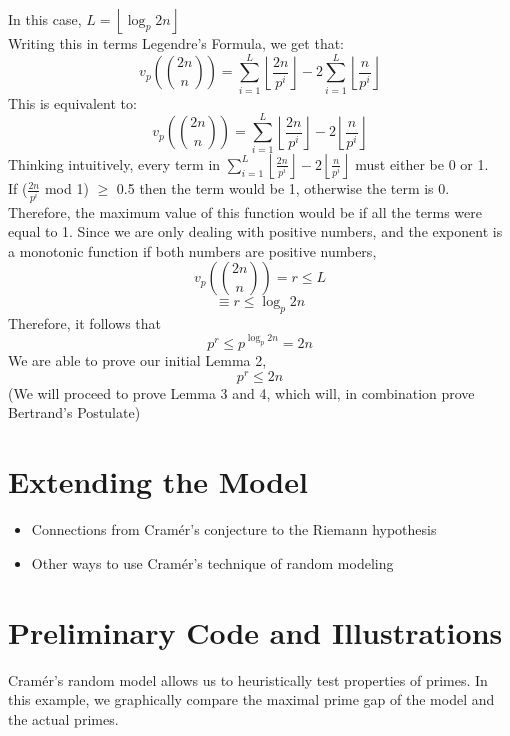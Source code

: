 \documentclass[12pt, letterpaper]{article}
\begin{document}
In this case, $L = \left\lfloor \log_{p}{2n} \right\rfloor$\\ Writing this in terms Legendre's Formula, we get that:
\[
    v_{p}(\binom{2n}{n}) = \sum_{i = 1}^{L} {\left\lfloor \frac{2n}{p^i} \right\rfloor} - 2\sum_{i = 1}^{L} {\left\lfloor \frac{n}{p^i} \right\rfloor}
\]
This is equivalent to:
\[
    v_{p}(\binom{2n}{n}) = \sum_{i = 1}^{L} {\left\lfloor \frac{2n}{p^i} \right\rfloor - 2\left\lfloor \frac{n}{p^i} \right\rfloor}
\]
Thinking intuitively, every term in $\sum_{i = 1}^{L} {\left\lfloor \frac{2n}{p^i} \right\rfloor - 2\left\lfloor \frac{n}{p^i} \right\rfloor}$ must either be 0 or 1.\\
If ($\frac{2n}{p^i}$ mod 1) $\geq$ 0.5 then the term would be 1, otherwise the term is 0. Therefore, the maximum value of this function would be if all the terms were equal to 1. Since we are only dealing with positive numbers, and the exponent is a monotonic function if both numbers are positive numbers,
\[
    v_{p}(\binom{2n}{n}) = r \leq L
\]
\[
    \equiv r \le \log_{p}{2n}
\]
Therefore, it follows that
\[
    p^r \le p^{\log_{p}{2n}} = 2n
\]
We are able to prove our initial Lemma 2, 
\[
    p^r \le 2n
\]
(We will proceed to prove Lemma 3 and 4, which will, in combination prove Bertrand's Postulate)

\section{Extending the Model}
\begin{itemize}
    \item Connections from Cram\'er's conjecture to the Riemann hypothesis
    \item Other ways to use Cram\'er's technique of random modeling
\end{itemize}


\section{Preliminary Code and Illustrations}

Cram\'er's random model allows us to heuristically test properties of primes.
In this example, we graphically compare the maximal prime gap of the model and the actual primes.
\end{document}

